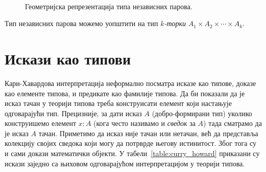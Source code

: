 \documentclass[12pt,oneside]{memoir}
\begin{document}
\begin{figure}[!ht]
    \centering\
    \label{fig:geo_prod}
    \caption{Геометријска репрезентација типа независних парова.}
\end{figure}

Тип независних парова можемо уопштити на тип \emph{$k$-торки} $A_1 \times A_2 \times \cdots \times A_k$.

\section{Искази као типови}

{\color{red}Кари-{}Хавардова} интерпретација неформално посматра исказе као типове, доказе као елементе типова, и предикате као фамилије типова. Да би показали да је исказ тачан у теорији типова треба конструисати елемент који настањује одговарајући тип. Прецизније, за дати исказ $A$ (добро-формирани тип) уколико конструишемо елемент $x : A$ (кога често називамо и \emph{сведок} за $A$) тада сматрамо да је исказ $A$ тачан. Приметимо да исказ није тачан или нетачан, већ да представља колекцију својих сведока који могу да потрврде његову истинитост. Због тога су и сами докази математички објекти. У табели~\ref{table:curry_howard} приказани су искази заједно са њиховом одговарајућом интерпретацијом у теорији типова.
\end{document}
